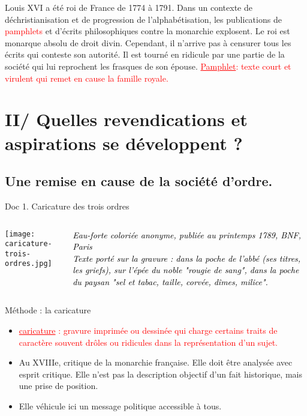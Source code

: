 \documentclass{beamer}
\begin{document}
\begin{frame}
\setlength{\parindent}{1cm} Louis XVI a été roi de France de 1774 à 1791.
\vfill
\setlength{\parindent}{1cm}Dans un contexte de déchristianisation et de progression de l'alphabétisation, les publications de \textcolor{red}{pamphlets} et d'écrits philosophiques contre la monarchie explosent. Le roi est monarque absolu de droit divin. Cependant, il n'arrive pas à censurer tous les écrits qui conteste son autorité. Il est tourné en ridicule par une partie de la société qui lui reprochent les frasques de son épouse.
\vfill
\textcolor{red}{\underline{Pamphlet}: texte court et virulent qui remet en cause la famille royale.}
\end{frame}

\section{II/ Quelles revendications et aspirations se développent ?}

\subsection{Une remise en cause de la société d'ordre.}

\begin{frame}
\begin{beamerboxesrounded}[scheme=blocimage]{Doc 1. Caricature des trois ordres}
\begin{columns}[c]
\begin{column}{7 cm}
\texttt{[image: caricature-trois-ordres.jpg]}
\end{column}

\begin{column}{3 cm}
\textcolor{black}{\small \textit{Eau-forte coloriée anonyme, publiée au printemps 1789, BNF, Paris \\
Texte porté sur la gravure : dans la poche de l'abbé (ses titres, les griefs), sur l'épée du noble "rougie de sang", dans la poche du paysan "sel et tabac, taille, corvée, dîmes, milice".}}
\end{column}
\end{columns}
\end{beamerboxesrounded}
\end{frame}

\begin{frame}{Méthode : la caricature}
\begin{itemize}
\item \textcolor{red}{\underline{caricature} : gravure imprimée ou dessinée qui charge certains traits de caractère souvent drôles ou ridicules dans la représentation d'un sujet.}
\item Au XVIIIe, critique de la monarchie française. Elle doit être analysée avec esprit critique. Elle n'est pas la description objectif d'un fait historique, mais une prise de position.
\item Elle véhicule ici un message politique accessible à tous.
\end{itemize}
\end{frame}
\end{document}

